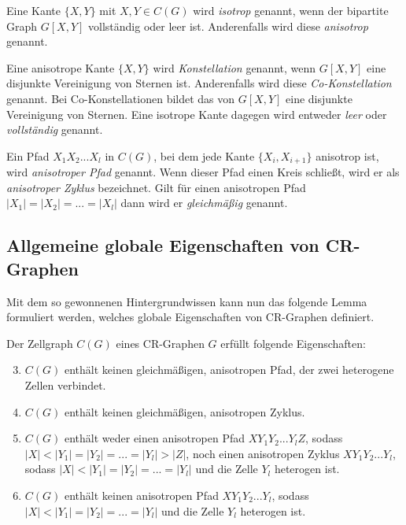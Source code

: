 \begin{Definition}
	Eine Kante $\{X,Y\}$ mit $X,Y\in C(G)$ wird \emph{isotrop} genannt, wenn der bipartite Graph $G[X,Y]$ vollständig oder leer ist. Anderenfalls wird diese \emph{anisotrop} genannt.
\end{Definition}

\begin{Definition}
	Eine anisotrope Kante $\{X,Y\}$ wird \emph{Konstellation} genannt, wenn $G[X,Y]$ eine disjunkte Vereinigung von Sternen ist.
	Anderenfalls wird diese \emph{Co-Konstellation} genannt.
	Bei Co-Konstellationen bildet das  von $G[X,Y]$ eine disjunkte Vereinigung von Sternen.
	Eine isotrope Kante dagegen wird entweder \emph{leer} oder \emph{vollständig} genannt.
\end{Definition}

\begin{Definition}
	 Ein Pfad $X_1X_2...X_l$ in $C(G)$, bei dem jede Kante $\{X_i,X_{i+1}\}$ anisotrop ist, wird \emph{anisotroper Pfad} genannt. Wenn dieser Pfad einen Kreis schließt, wird er als \emph{anisotroper Zyklus} bezeichnet. Gilt für einen anisotropen Pfad $|X_1|=|X_2|=...=|X_l|$ dann wird er \emph{gleichmäßig} genannt.
\end{Definition}

\subsection{Allgemeine globale Eigenschaften von CR-Graphen}
Mit dem so gewonnenen Hintergrundwissen kann nun das folgende Lemma formuliert werden, welches globale Eigenschaften von CR-Graphen definiert.

\begin{Lemma}
	Der Zellgraph $C(G)$ eines CR-Graphen $G$ erfüllt folgende Eigenschaften:

	\begin{enumerate}[label=(\Alph*)]
		\setcounter{enumi}{2}
		\item $C(G)$ enthält keinen gleichmäßigen, anisotropen Pfad, der zwei heterogene Zellen verbindet.
		\item $C(G)$ enthält keinen gleichmäßigen, anisotropen Zyklus.
		\item $C(G)$ enthält weder einen anisotropen Pfad $XY_1Y_2...Y_lZ$, sodass $|X|<|Y_1|=|Y_2|=...=|Y_l|>|Z|$, noch einen anisotropen Zyklus $XY_1Y_2...Y_l$, sodass $|X|<|Y_1|=|Y_2|=...=|Y_l|$ und die Zelle $Y_l$ heterogen ist.
		\item $C(G)$ enthält keinen anisotropen Pfad $XY_1Y_2...Y_l$, sodass $|X|<|Y_1|=|Y_2|=...=|Y_l|$ und die Zelle $Y_l$ heterogen ist.
	\end{enumerate}
	\label{lemma:global1}
\end{Lemma}

